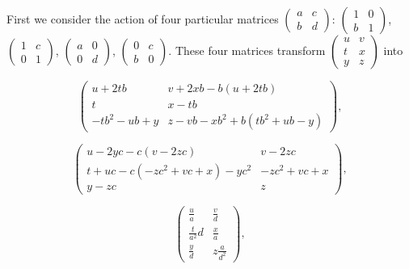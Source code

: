 \documentclass[12pt]{article}
\begin{document}
First we consider the action of four particular matrices $\left( 
\begin{array}{ll}
a & c \\ 
b & d%
\end{array}%
\right) $: $\left( 
\begin{array}{ll}
1 & 0 \\ 
b & 1%
\end{array}%
\right) $, $\left( 
\begin{array}{ll}
1 & c \\ 
0 & 1%
\end{array}%
\right) $, $\left( 
\begin{array}{ll}
a & 0 \\ 
0 & d%
\end{array}%
\right) $, $\left( 
\begin{array}{ll}
0 & c \\ 
b & 0%
\end{array}%
\right) $. These four matrices transform $\left( 
\begin{array}{ll}
u & v \\ 
t & x \\ 
y & z%
\end{array}%
\right) $ into

\begin{equation}
\allowbreak \left( 
\begin{array}{cc}
u+2tb & v+2xb-b\left( u+2tb\right)  \\ 
t & x-tb \\ 
-tb^{2}-ub+y & z-vb-xb^{2}+b\left( tb^{2}+ub-y\right) 
\end{array}%
\right) ,
\end{equation}

\begin{equation}
\allowbreak \left( 
\begin{array}{cc}
u-2yc-c\left( v-2zc\right)  & v-2zc \\ 
t+uc-c\left( -zc^{2}+vc+x\right) -yc^{2} & -zc^{2}+vc+x \\ 
y-zc & z%
\end{array}%
\right) ,
\end{equation}

\begin{equation}
\allowbreak \left( 
\begin{array}{cc}
\frac{u}{a} & \frac{v}{d} \\ 
\frac{t}{a^{2}}d & \frac{x}{a} \\ 
\frac{y}{d} & z\frac{a}{d^{2}}%
\end{array}%
\right) ,
\end{equation}
\end{document}
